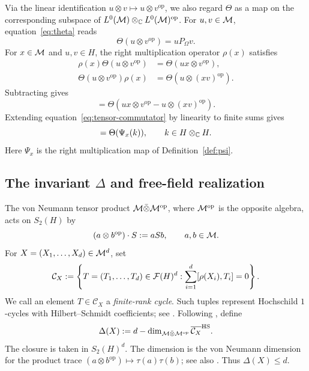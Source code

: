 Via the linear identification $u\otimes v\mapsto u\otimes v^{\mathrm{op}}$, we also regard $\Theta$ as a map on the corresponding subspace of $L^0(\mathcal M)\otimes_{\mathbb C}L^0(\mathcal M)^{\mathrm{op}}$.
For $u,v\in\mathcal M$, equation~\eqref{eq:theta} reads
\begin{equation}\label{eq:theta-bounded}
 \Theta(u\otimes v^{\mathrm{op}})=uP_\Omega v.
\end{equation}
For $x\in\mathcal M$ and $u,v\in H$, the right multiplication operator $\rho(x)$ satisfies
\begin{align*}
 \rho(x)\Theta(u\otimes v^{\mathrm{op}})
   &=\Theta(ux\otimes v^{\mathrm{op}}),\\
 \Theta(u\otimes v^{\mathrm{op}})\rho(x)
   &=\Theta(u\otimes(xv)^{\mathrm{op}}).
\end{align*}
Subtracting gives
\begin{equation}
 [\rho(x),\Theta(u\otimes v^{\mathrm{op}})]
   =\Theta(ux\otimes v^{\mathrm{op}}-u\otimes(xv)^{\mathrm{op}}).
 \label{eq:tensor-commutator}
\end{equation}
Extending equation~\eqref{eq:tensor-commutator} by linearity to finite sums gives
\begin{equation}
 [\rho(x),\Theta(k)]=\Theta(\Psi_x(k)),
 \qquad k\in H\otimes_{\C}H.
 \label{eq:tensor-commutator-general}
\end{equation}
Here $\Psi_x$ is the right multiplication map of Definition~\ref{def:psi}.

\subsection{The invariant \texorpdfstring{$\Delta$}{Delta} and free-field realization}\label{subsec:delta-tensor-maps}

\begin{definition}\label{def:delta}
The von Neumann tensor product $\mathcal M\bar\otimes\mathcal M^{\mathrm{op}}$, where $\mathcal M^{\mathrm{op}}$ is the opposite algebra, acts on $S_2(H)$ by
\[
 (a\otimes b^{\mathrm{op}})\cdot S:=aSb,\qquad a,b\in\mathcal M.
\]
For $X=(X_1,\ldots,X_d)\in\mathcal M^d$, set
\[
 \mathcal C_X:=
 \left\{T=(T_1,\ldots,T_d)\in\mathcal F(H)^d:
 \sum_{i=1}^d[\rho(X_i),T_i]=0\right\}.
\]
We call an element $T\in\mathcal C_X$ a \emph{finite-rank cycle}.
Such tuples represent Hochschild $1$-cycles with Hilbert--Schmidt coefficients; see \cite{CS05}.
Following \cite{CS05}, define
\begin{equation}
 \Delta(X):=d-\dim_{\mathcal M\bar\otimes\mathcal M^{\mathrm{op}}}
 \overline{\mathcal C_X}^{\operatorname{HS}}.
 \label{eq:delta-definition}
\end{equation}
The closure is taken in $S_2(H)^d$.
The dimension is the von Neumann dimension \cite[Definition~1.10]{Luc02} for the product trace $(a\otimes b^{\mathrm{op}})\mapsto\tau(a)\tau(b)$; see also \cite[Definition~2.10]{CS05}.
Thus $\Delta(X)\leq d$.
\end{definition}

